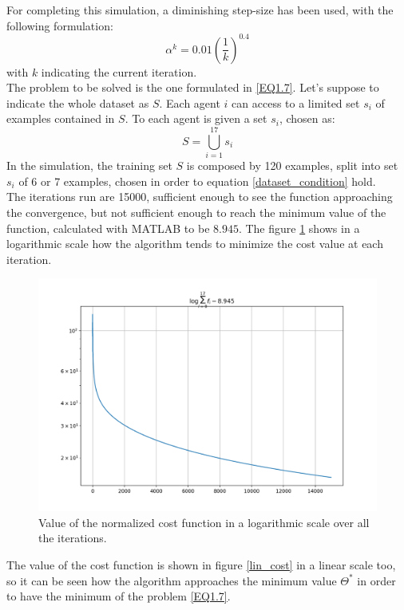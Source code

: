 \documentclass[a4paper,11pt,oneside]{book}
\begin{document}
For completing this simulation, a diminishing step-size has been used, with the following formulation:
\begin{equation}
	\alpha^k = 0.01 \left( \dfrac{1}{k} \right) ^{0.4}
\end{equation}
with $k$ indicating the current iteration.\\
The problem to be solved is the one formulated in \ref{EQ1.7}. Let's suppose to indicate the whole dataset as $S$. Each agent $i$ can access to a limited set $s_i$ of examples contained in $S$. To each agent is given a set $s_i$, chosen as:
\begin{equation}
	\label{dataset_condition}
	S = \bigcup\limits_{i=1}^{17} s_i
\end{equation}
In the simulation, the training set $S$ is composed by 120 examples, split into set $s_i$ of 6 or 7 examples, chosen in order to equation \ref{dataset_condition} hold.  \\
The iterations run are 15000, sufficient enough to see the function approaching the convergence, but not sufficient enough to reach the minimum value of the function, calculated with MATLAB to be $8.945$. The figure \ref{log_cost} shows in a logarithmic scale how the algorithm tends to minimize the cost value at each iteration. \\
\begin{figure}[hb]
	\centering
	\includegraphics[scale=0.4]{figs/cost_log_scale}
	\caption{Value of the normalized cost function in a logarithmic scale over all the iterations. }
	\label{log_cost}
\end{figure}

The value of the cost function is shown in figure \ref{lin_cost} in a linear scale too, so it can be seen how the algorithm approaches the minimum value $\Theta^{*}$ in order to have the minimum of the problem \ref{EQ1.7}.
\end{document}
